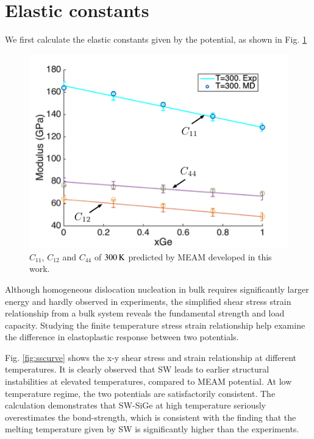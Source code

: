 \documentclass[review]{elsarticle}
\begin{document}
\section{Elastic constants}
We first calculate the elastic constants given by the potential, as shown in Fig. \ref{fig:elastic_constants}

\begin{figure}[H]
\centering
\includegraphics[width=.55\linewidth]{Figures/C11_12_44.png}
\caption{$C_{11}$, $C_{12}$ and $C_{44}$ of ${\rm 300\,K}$  predicted by MEAM developed in this work.}
\label{fig:elastic_constants}
\end{figure}

Although homogeneous dislocation nucleation in bulk requires significantly larger energy and hardly observed in experiments, the simplified shear stress strain relationship from a bulk system reveals the fundamental strength and load capacity. Studying the finite temperature stress strain relationship help examine the difference in elastoplastic response between two potentials. 

Fig. \ref{fig:sscurve} shows the x-y shear stress and strain relationship at different temperatures. It is clearly observed that SW leads to earlier structural instabilities at elevated temperatures, compared to MEAM potential. At low temperature regime, the two potentials are satisfactorily consistent. The calculation demonstrates that SW-SiGe at high temperature seriously overestimates the bond-strength, which is consistent with the finding that the melting temperature given by SW is significantly higher than the experiments.
\end{document}
